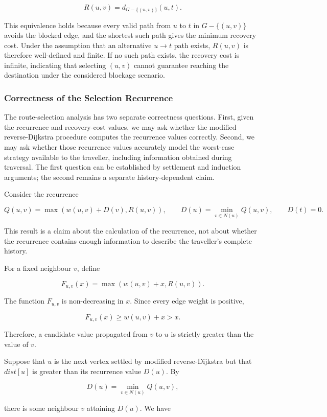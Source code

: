 \documentclass{article}
\begin{document}
\[
R(u,v)=d_{G-\{(u,v)\}}(u,t).
\]

This equivalence holds because every valid path from $u$ to $t$ in $G-\{(u,v)\}$ avoids the blocked edge, and the shortest such path gives the minimum recovery cost. Under the assumption that an alternative $u \to t$ path exists, $R(u,v)$ is therefore well-defined and finite. If no such path exists, the recovery cost is infinite, indicating that selecting $(u,v)$ cannot guarantee reaching the destination under the considered blockage scenario.

\subsubsection{Correctness of the Selection Recurrence}

The route-selection analysis has two separate correctness questions. First, given the recurrence and recovery-cost values, we may ask whether the modified reverse-Dijkstra procedure computes the recurrence values correctly. Second, we may ask whether those recurrence values accurately model the worst-case strategy available to the traveller, including information obtained during traversal. The first question can be established by settlement and induction arguments; the second remains a separate history-dependent claim.

Consider the recurrence

\[
Q(u,v)=\max\left(w(u,v)+D(v),R(u,v)\right),
\qquad
D(u)=\min_{v\in N(u)}Q(u,v),
\qquad D(t)=0.
\]

This result is a claim about the calculation of the recurrence, not about whether the recurrence contains enough information to describe the traveller's complete history.

For a fixed neighbour $v$, define

\[
F_{u,v}(x)=\max\left(w(u,v)+x,R(u,v)\right).
\]

The function $F_{u,v}$ is non-decreasing in $x$. Since every edge weight is positive,

\[
F_{u,v}(x)\geq w(u,v)+x>x.
\]

Therefore, a candidate value propagated from $v$ to $u$ is strictly greater than the value of $v$.

Suppose that $u$ is the next vertex settled by modified reverse-Dijkstra but that $dist[u]$ is greater than its recurrence value $D(u)$. By

\[
D(u)=\min_{v\in N(u)}Q(u,v),
\]

there is some neighbour $v$ attaining $D(u)$. We have
\end{document}
